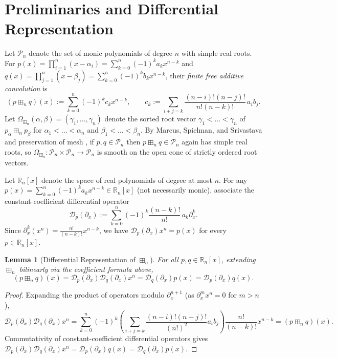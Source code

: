 \documentclass[11pt,a4paper]{article}
\newtheorem{lemma}[theorem]{Lemma}
\theoremstyle{definition}
\newcommand{\R}{\mathbb{R}}
\newcommand{\boxplusn}{\boxplus_n}
\begin{document}
\section{Preliminaries and Differential Representation}

Let $\mathcal{P}_n$ denote the set of monic polynomials of degree $n$ with simple real roots. For $p(x) = \prod_{i=1}^n (x - \alpha_i) = \sum_{k=0}^n (-1)^k a_k x^{n-k}$ and $q(x) = \prod_{j=1}^n (x - \beta_j) = \sum_{k=0}^n (-1)^k b_k x^{n-k}$, their \emph{finite free additive convolution} \cite{MSS2022} is
\[
(p \boxplusn q)(x) := \sum_{k=0}^n (-1)^k c_k x^{n-k}, \qquad c_k := \sum_{i+j=k} \frac{(n-i)!(n-j)!}{n!(n-k)!}\, a_i b_j.
\]
Let $\Omega_{\boxplusn}(\alpha, \beta) = (\gamma_1,\dots,\gamma_n)$ denote the sorted root vector $\gamma_1 < \dots < \gamma_n$ of $p_\alpha \boxplusn p_\beta$ for $\alpha_1 < \dots < \alpha_n$ and $\beta_1 < \dots < \beta_n$. By Marcus, Spielman, and Srivastava \cite{MSS2022} and preservation of mesh \cite[Theorem~2.14]{GSS2026}, if $p, q \in \mathcal{P}_n$ then $p \boxplusn q \in \mathcal{P}_n$ again has simple real roots, so $\Omega_{\boxplusn} : \mathcal{P}_n \times \mathcal{P}_n \to \mathcal{P}_n$ is smooth on the open cone of strictly ordered root vectors.

Let $\R_n[x]$ denote the space of real polynomials of degree at most $n$. For any $p(x) = \sum_{k=0}^n (-1)^k a_k x^{n-k} \in \R_n[x]$ (not necessarily monic), associate the constant-coefficient differential operator
\[
\mathcal{D}_p(\partial_x) := \sum_{k=0}^n (-1)^k \frac{(n-k)!}{n!}\, a_k \partial_x^k.
\]
Since $\partial_x^k (x^n) = \frac{n!}{(n-k)!} x^{n-k}$, we have $\mathcal{D}_p(\partial_x) x^n = p(x)$ for every $p \in \R_n[x]$.

\begin{lemma}[Differential Representation of $\boxplusn$]
\label{lem:diff-op}
For all $p, q \in \R_n[x]$, extending $\boxplusn$ bilinearly via the coefficient formula above,
\[
(p \boxplusn q)(x) = \mathcal{D}_p(\partial_x) \mathcal{D}_q(\partial_x) x^n = \mathcal{D}_q(\partial_x) p(x) = \mathcal{D}_p(\partial_x) q(x).
\]
\end{lemma}

\begin{proof}
Expanding the product of operators modulo $\partial_x^{n+1}$ (as $\partial_x^m x^n = 0$ for $m > n$),
\[
\mathcal{D}_p(\partial_x)\mathcal{D}_q(\partial_x) x^n
= \sum_{k=0}^n (-1)^k \left(\sum_{i+j=k} \frac{(n-i)!(n-j)!}{(n!)^2} a_i b_j\right) \frac{n!}{(n-k)!} x^{n-k}
= (p \boxplusn q)(x).
\]
Commutativity of constant-coefficient differential operators gives $\mathcal{D}_p(\partial_x)\mathcal{D}_q(\partial_x)x^n = \mathcal{D}_p(\partial_x) q(x) = \mathcal{D}_q(\partial_x) p(x)$.
\end{proof}
\end{document}
